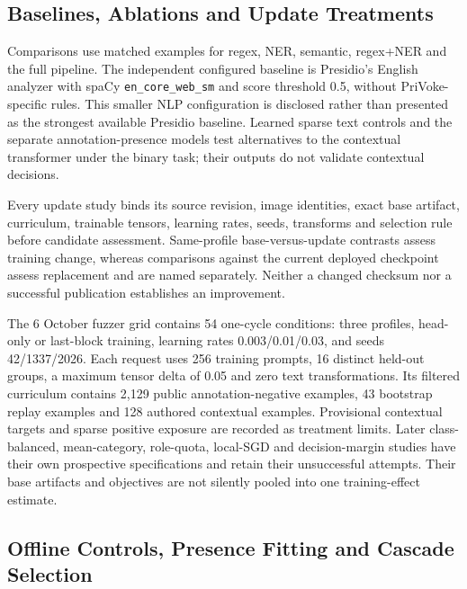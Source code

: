 \documentclass[conference]{IEEEtran}
\begin{document}
\subsection{Baselines, Ablations and Update Treatments}

Comparisons use matched examples for regex, NER, semantic, regex+NER and the full pipeline. The independent configured baseline is Presidio's English analyzer with spaCy \texttt{en\_core\_web\_sm} and score threshold 0.5, without PriVoke-specific rules. This smaller NLP configuration is disclosed rather than presented as the strongest available Presidio baseline. Learned sparse text controls and the separate annotation-presence models test alternatives to the contextual transformer under the binary task; their outputs do not validate contextual decisions.

Every update study binds its source revision, image identities, exact base artifact, curriculum, trainable tensors, learning rates, seeds, transforms and selection rule before candidate assessment. Same-profile base-versus-update contrasts assess training change, whereas comparisons against the current deployed checkpoint assess replacement and are named separately. Neither a changed checksum nor a successful publication establishes an improvement.

The 6 October fuzzer grid contains 54 one-cycle conditions: three profiles, head-only or last-block training, learning rates 0.003/0.01/0.03, and seeds 42/1337/2026. Each request uses 256 training prompts, 16 distinct held-out groups, a maximum tensor delta of 0.05 and zero text transformations. Its filtered curriculum contains 2,129 public annotation-negative examples, 43 bootstrap replay examples and 128 authored contextual examples. Provisional contextual targets and sparse positive exposure are recorded as treatment limits. Later class-balanced, mean-category, role-quota, local-SGD and decision-margin studies have their own prospective specifications and retain their unsuccessful attempts. Their base artifacts and objectives are not silently pooled into one training-effect estimate.

\subsection{Offline Controls, Presence Fitting and Cascade Selection}
\end{document}
